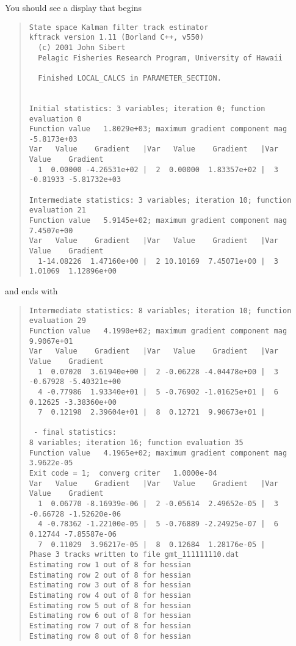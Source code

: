 \documentclass[12pt,draft,titlepage,twoside]{article}
\begin{document}
You should see a display that begins
\begin{quotation}
{\overfullrule=0pt\scriptsize
\noindent
\begin{verbatim}
State space Kalman filter track estimator
kftrack version 1.11 (Borland C++, v550)
  (c) 2001 John Sibert
  Pelagic Fisheries Research Program, University of Hawaii

  Finished LOCAL_CALCS in PARAMETER_SECTION.


Initial statistics: 3 variables; iteration 0; function evaluation 0
Function value   1.8029e+03; maximum gradient component mag  -5.8173e+03
Var   Value    Gradient   |Var   Value    Gradient   |Var   Value    Gradient   
  1  0.00000 -4.26531e+02 |  2  0.00000  1.83357e+02 |  3 -0.81933 -5.81732e+03

Intermediate statistics: 3 variables; iteration 10; function evaluation 21
Function value   5.9145e+02; maximum gradient component mag   7.4507e+00
Var   Value    Gradient   |Var   Value    Gradient   |Var   Value    Gradient   
  1-14.08226  1.47160e+00 |  2 10.10169  7.45071e+00 |  3  1.01069  1.12896e+00
\end{verbatim}
}
\end{quotation}

\noindent and ends with
\begin{quotation}
\noindent
{\overfullrule=0pt\scriptsize
\begin{verbatim}
Intermediate statistics: 8 variables; iteration 10; function evaluation 29
Function value   4.1990e+02; maximum gradient component mag   9.9067e+01
Var   Value    Gradient   |Var   Value    Gradient   |Var   Value    Gradient   
  1  0.07020  3.61940e+00 |  2 -0.06228 -4.04478e+00 |  3 -0.67928 -5.40321e+00
  4 -0.77986  1.93340e+01 |  5 -0.76902 -1.01625e+01 |  6  0.12625 -3.38360e+00
  7  0.12198  2.39604e+01 |  8  0.12721  9.90673e+01 |

 - final statistics:
8 variables; iteration 16; function evaluation 35
Function value   4.1965e+02; maximum gradient component mag   3.9622e-05
Exit code = 1;  converg criter   1.0000e-04
Var   Value    Gradient   |Var   Value    Gradient   |Var   Value    Gradient   
  1  0.06770 -8.16939e-06 |  2 -0.05614  2.49652e-05 |  3 -0.66728 -1.52620e-06
  4 -0.78362 -1.22100e-05 |  5 -0.76889 -2.24925e-07 |  6  0.12744 -7.85587e-06
  7  0.11029  3.96217e-05 |  8  0.12684  1.28176e-05 |
Phase 3 tracks written to file gmt_111111110.dat
Estimating row 1 out of 8 for hessian
Estimating row 2 out of 8 for hessian
Estimating row 3 out of 8 for hessian
Estimating row 4 out of 8 for hessian
Estimating row 5 out of 8 for hessian
Estimating row 6 out of 8 for hessian
Estimating row 7 out of 8 for hessian
Estimating row 8 out of 8 for hessian
\end{verbatim}
}
\end{quotation}
\end{document}
